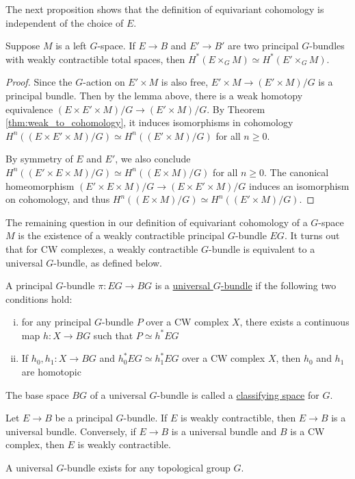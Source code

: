 The next proposition shows that the definition of equivariant cohomology is
independent of the choice of  $E$. 
\begin{prop} %
	Suppose $M$ is a left  $G$-space. If $E\to B$ and  $E'\to B'$ are two principal
	$G$-bundles with weakly contractible total spaces, then $H^*(E\times_G M)
	\simeq H^*(E'\times_G M)$.
\end{prop}
\begin{proof}
	Since the $G$-action on  $E'\times M$ is also free,  $E'\times M \to
	(E'\times M) /G$ is a principal bundle. Then by the lemma above, 
	there is a weak homotopy equivalence 
	$(E\times E' \times M) /G \to (E'\times M) /G$. By 
	Theorem \ref{thm:weak_to_cohomology}, it
	induces isomorphisms in cohomology  $H^n((E\times E'\times M )/G) \simeq
	H^n((E'\times M) /G)$ for all  $n\geq 0$.

	By symmetry of $E$ and  $E'$, we also conclude  $H^n((E'\times E\times M )/G) \simeq
	H^n((E\times M) /G)$ for all  $n\geq 0$. The canonical homeomorphism
	$(E'\times E \times M) /G \to (E\times E'\times M) /G$ induces an
	isomorphism on cohomology, and thus $H^n((E\times M) /G) \simeq
	H^n((E'\times M) /G)$.
\end{proof}

The remaining question in our definition of equivariant cohomology of a
$G$-space $M$ is the existence of a weakly contractible principal $G$-bundle $EG$. 
It turns out that for CW complexes,  
a weakly contractible $G$-bundle is equivalent to a universal $G$-bundle, as
defined below.
\begin{defn}
	A principal $G$-bundle  $\pi:EG\to BG$ is a \underline{universal $G$-bundle} 
	if the following two conditions hold:
	\begin{enumerate}[(i)]
	    \item for any principal $G$-bundle  $P$ over a CW complex $X$, there
			exists a continuous map  $h:X\to BG$ such that  $P \simeq h^*EG$ 
		\item If $h_0,h_1:X\to BG$ and $h_0^*EG \simeq h_1^*EG$ over a CW
			complex $X$, then  $h_0$ and $h_1$ are homotopic
	\end{enumerate}
	The base space $BG$ of a universal  $G$-bundle is called a
	\underline{classifying space} for  $G$.
\end{defn}
\begin{thm}[Steenrod 1951] %
	Let $E\to B$ be a principal  $G$-bundle. If  $E$ is weakly contractible,
	then  $E\to B$ is a universal bundle. Conversely, if  $E\to B$ is a
	universal bundle and  $B$ is a CW complex, then  $E$ is weakly contractible.
\end{thm}
\begin{thm} %
	A universal $G$-bundle exists for any topological group  $G$.
\end{thm}

